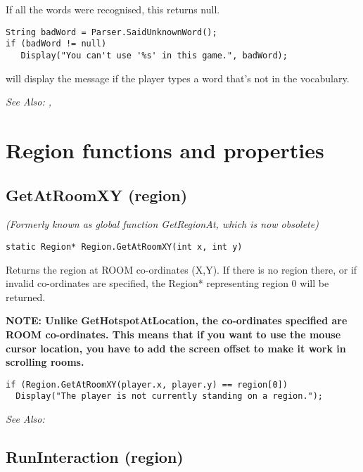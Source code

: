 If all the words were recognised, this returns null.

\begin{verbatim}
String badWord = Parser.SaidUnknownWord();
if (badWord != null)
   Display("You can't use '%s' in this game.", badWord);
\end{verbatim}
will display the message if the player types a word that's not in the vocabulary.

\it{See Also:} , 


\section{Region functions and properties}%


\subsection{GetAtRoomXY (region)}\label{Region.GetAtRoomXY}%

\it{(Formerly known as global function GetRegionAt, which is now obsolete)}

\begin{verbatim}
static Region* Region.GetAtRoomXY(int x, int y)
\end{verbatim}
Returns the region at ROOM co-ordinates (X,Y).
If there is no region there, or if invalid co-ordinates are specified,
the Region* representing region 0 will be returned.

\bf{NOTE:} Unlike GetHotspotAtLocation, the co-ordinates specified are ROOM co-ordinates. This
means that if you want to use the mouse cursor location, you have to add the
screen offset to make it work in scrolling rooms.

\begin{verbatim}
if (Region.GetAtRoomXY(player.x, player.y) == region[0])
  Display("The player is not currently standing on a region.");
\end{verbatim}

\it{See Also:} 


\subsection{RunInteraction (region)}\label{Region.RunInteraction}%

